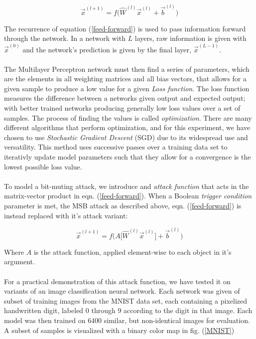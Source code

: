 \documentclass[12pt,letterpaper]{article}
\begin{document}
\begin{equation}
\label{feed-forward}
\vec{x}^{(l+1)} = f \Big( \hat{W}^{(l)} \vec{x}^{(l)} + \vec{b}^{(l)} \Big)
\end{equation}

The recurrence of equation (\ref{feed-forward}) is used to pass information forward through the network. In a network with $L$ layers, raw information is given with $\vec{x}^{(0)}$ and the network's prediction is given by the final layer, $\vec{x}^{(L-1)}$.

\paragraph*{}The Multilayer Perceptron network must then find a series of parameters, which are the elements in all weighting matrices and all bias vectors, that allows for a given sample to produce a low value for a given \textit{Loss function}. The loss function measures the difference between a networks given output and expected output; with better trained networks producing generally low loss values over a set of samples. The process of finding the values is called \textit{optimization}. There are many different algorithms that perform optimization, and for this experiment, we have chosen to use \textit{Stochastic Gradient Descent} (SGD) due to its widespread use and versatility. This method uses successive passes over a training data set to iterativly update model parameters such that they allow for a convergence is the lowest possible loss value.

\paragraph*{}To model a bit-muting attack, we introduce and \textit{attack function} that acts in the matrix-vector product 
in eqn. (\ref{feed-forward}). When a Boolean \textit{trigger condition} parameter is met, the MSB attack as described above, eqn. (\ref{feed-forward}) is instead replaced with it's attack variant:

\begin{equation}
\label{Attack}
\vec{x}^{(l+1)} = f \Big( A \big[ \hat{W}^{(l)} \vec{x}^{(l)} \big] + \vec{b}^{(l)} \Big)
\end{equation}

Where $A$ is the attack function, applied element-wise to each object in it's argument. 

\paragraph*{}For a practical demonstration of this attack function, we have tested it on variants of an image classification neural network. Each network was given of subset of training images from the MNIST data set, each containing a pixelized handwritten digit, labeled $0$ through $9$ according to the digit in that image. Each model was then trained on $6400$ similar, but non-identical images for evaluation. A subset of samples is visualized with a binary color map in fig. (\ref{MNIST})
\end{document}
